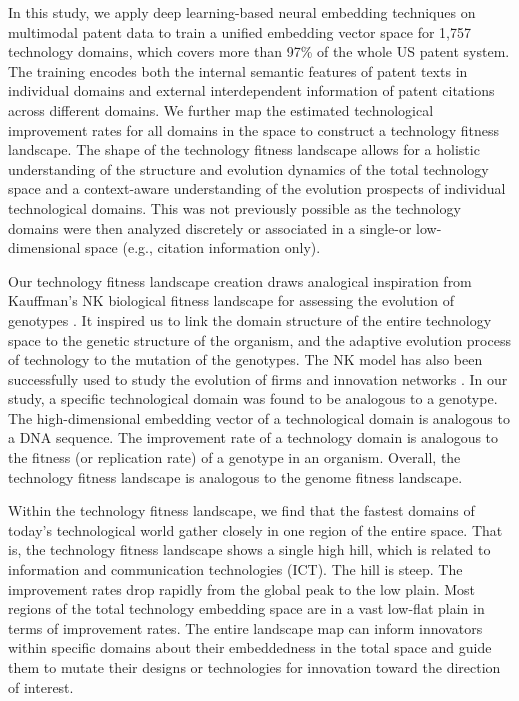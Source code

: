 \documentclass{article}
\begin{document}
In this study, we apply deep learning-based neural embedding techniques on multimodal patent data to train a unified embedding vector space for 1,757 technology domains, which covers more than 97\% of the whole US patent system. The training encodes both the internal semantic features of patent texts in individual domains and external interdependent information of patent citations across different domains. We further map the estimated technological improvement rates for all domains in the space to construct a technology fitness landscape. The shape of the technology fitness landscape allows for a holistic understanding of the structure and evolution dynamics of the total technology space and a context-aware understanding of the evolution prospects of individual technological domains. This was not previously possible as the technology domains were then analyzed discretely or associated in a single-or low-dimensional space (e.g., citation information only).

Our technology fitness landscape creation draws analogical inspiration from Kauffman’s NK biological fitness landscape for assessing the evolution of genotypes \cite{kauffman1993origins}. It inspired us to link the domain structure of the entire technology space to the genetic structure of the organism, and the adaptive evolution process of technology to the mutation of the genotypes. The NK model has also been successfully used to study the evolution of firms \cite{levinthal1997adaptation} and innovation networks \cite{ganco2017nk}. In our study, a specific technological domain was found to be analogous to a genotype. The high-dimensional embedding vector of a technological domain is analogous to a DNA sequence. The improvement rate of a technology domain is analogous to the fitness (or replication rate) of a genotype in an organism. Overall, the technology fitness landscape is analogous to the genome fitness landscape.

Within the technology fitness landscape, we find that the fastest domains of today’s technological world gather closely in one region of the entire space. That is, the technology fitness landscape shows a single high hill, which is related to information and communication technologies (ICT). The hill is steep. The improvement rates drop rapidly from the global peak to the low plain. Most regions of the total technology embedding space are in a vast low-flat plain in terms of improvement rates. The entire landscape map can inform innovators within specific domains about their embeddedness in the total space and guide them to mutate their designs or technologies for innovation toward the direction of interest.
\end{document}
